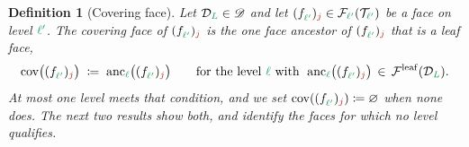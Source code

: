 \documentclass[a4paper, 12pt]{article}
\makeatletter
\newcommand{\green}{\color{ForestGreen}}
\newcommand{\brickred}{\color{BrickRed}}
\newcommand{\T}{\mathcal{T}}
\newcommand{\F}{\mathcal{F}}
\newcommand{\face}[2]{\freeQ{f}{}{#1}{#2}}
\newcommand{\fineIdxone}{{\brickred j}}
\renewcommand{\l}{{\green\ell}}
\renewcommand{\L}{{\green L}}
\newcommand{\lone}{{\green {\l'}  }}
\newcommand{\freeQ}[4]{ ( {#1}^{#2}_{#3} )_{#4}}
\newtheorem{definition}[theorem]{Definition}
\theoremstyle{definition}
\theoremstyle{plain}
\numberwithin{equation}{section}
\DeclareRobustCommand{\domseq}[1][]{\mathcal{D}\ifx\@empty#1\@empty\else_{#1}\fi}
\newcommand{\alldomseqs}{\mathscr{D}}
\newcommand{\leafMesh}{\F^{\mathrm{leaf}}}                  %
\newcommand{\anc}[1]{\mathrm{anc}_{#1}}                     %
\newcommand{\coveringFace}{\mathrm{cov}}                    %
\makeatother
\begin{document}
\begin{definition}[Covering face]
    \label{def:covering_face}
    Let $\domseq[\L] \in \alldomseqs$ and let $\face{\lone}{\fineIdxone} \in \F_{\lone}(\T_\lone)$ be a face on level $\lone$. The \emph{covering face} of $\face{\lone}{\fineIdxone}$ is the one face ancestor of $\face{\lone}{\fineIdxone}$ that is a leaf face,
    \begin{equation}
        \label{eq:covering_face}
        \coveringFace \big( \face{\lone}{\fineIdxone} \big) \; \coloneq \; \anc{\l} \big( \face{\lone}{\fineIdxone} \big) \qquad \text{for the level } \l \text{ with } \; \anc{\l} \big( \face{\lone}{\fineIdxone} \big) \, \in \, \leafMesh(\domseq[\L]) .
    \end{equation}
    At most one level meets that condition, and we set $\coveringFace(\face{\lone}{\fineIdxone}) \coloneq \varnothing$ when none does. The next two results show both, and identify the faces for which no level qualifies.
\end{definition}
\end{document}
